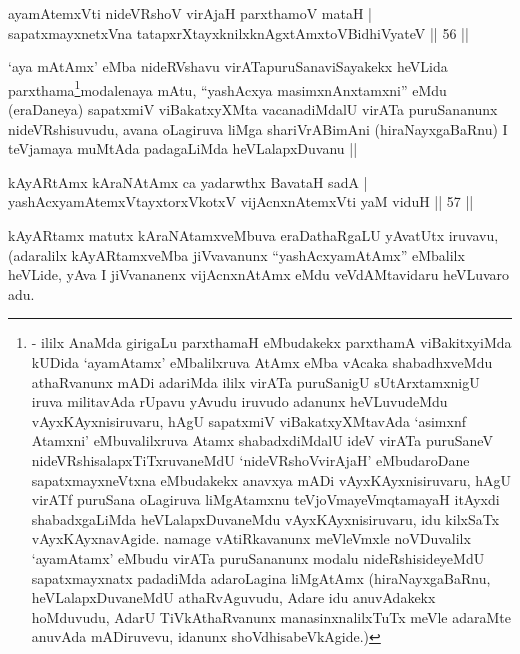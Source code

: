 \begin{shl}
ayamAtemxVti nideVRshoV virAjaH parxthamoV mataH |\\
sapatxmayxnetxVna tatapxrXtayxknilxknAgxtAmx\s toV\s BidhiVyateV \hfill || 56 ||
\end{shl}

\begin{artha}
`aya mAtAmx' eMba nideRVshavu virATapuruSanaviSayakekx heVLida
  parxthama\footnote[1]{- ililx AnaMda girigaLu parxthamaH eMbudakekx
    parxthamA viBakitxyiMda kUDida `ayamAtamx' eMbalilxruva AtAmx eMba
    vAcaka shabadhxveMdu athaRvanunx mADi adariMda ililx virATa
    puruSanigU sUtArxtamxnigU iruva militavAda rUpavu yAvudu iruvudo
    adanunx heVLuvudeMdu vAyxKAyxnisiruvaru, hAgU sapatxmiV viBakatxyXMtavAda `asimxnf Atamxni' eMbuvalilxruva Atamx shabadxdiMdalU ideV virATa puruSaneV nideVRshisalapxTiTxruvaneMdU `nideVRshoVvirAjaH'
    eMbudaroDane sapatxmayxneVtxna eMbudakekx anavxya mADi
    vAyxKAyxnisiruvaru, hAgU virATf puruSana oLagiruva liMgAtamxnu
teVjoVmayeV\s mqtamayaH itAyxdi shabadxgaLiMda heVLalapxDuvaneMdu vAyxKAyxnisiruvaru,
idu kilxSaTx vAyxKAyxnavAgide. namage vAtiRkavanunx meVleVmxle
noVDuvalilx `ayamAtamx' eMbudu virATa puruSananunx modalu
nideRshisideyeMdU sapatxmayxnatx padadiMda adaroLagina liMgAtAmx
(hiraNayxgaBaRnu, heVLalapxDuvaneMdU athaRvAguvudu, Adare idu
anuvAdakekx hoMduvudu, AdarU TiVkAthaRvanunx manasinxnalilxTuTx meVle
adaraMte anuvAda mADiruvevu, idanunx shoVdhisabeVkAgide.)}modalenaya mAtu, ``yashAcxya
  masimxnAnxtamxni'' eMdu (eraDaneya) sapatxmiV viBakatxyXMta
  vacanadiMdalU virATa puruSananunx nideVRshisuvudu, avana oLagiruva
  liMga shariVrABimAni (hiraNayxgaBaRnu) I teVjamaya muMtAda
  padagaLiMda heVLalapxDuvanu ||
\end{artha}

\begin{shl}
kAyARtAmx kAraNAtAmx ca yadarwthx BavataH sadA |\\
yashAcxyamAtemxVtayxtorxVkotxV vijAcnxnAtemxVti yaM viduH \hfill || 57 ||
\end{shl}

\begin{artha}
kAyARtamx matutx kAraNAtamxveMbuva eraDathaRgaLU yAvatUtx iruvavu, (adaralilx kAyARtamxveMba jiVvavanunx ``yashAcxyamAtAmx'' eMbalilx heVLide, yAva I jiVvananenx vijAcnxnAtAmx eMdu veVdAMtavidaru heVLuvaro adu.
\end{artha}


